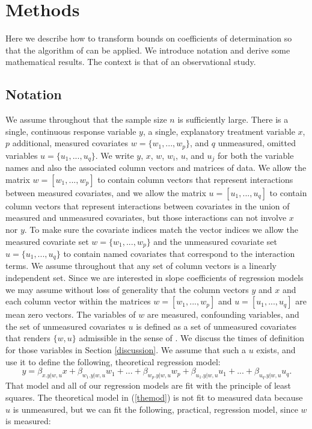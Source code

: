 \documentclass[11pt]{amsart}
\begin{document}
\section{Methods}
\label{methods}
Here we describe how to transform bounds on coefficients of determination so that the algorithm of \citep{KOA} can be applied. We introduce notation and derive some mathematical results. The context is that of an observational study. 
\subsection{Notation}We assume throughout that the sample size $n$ is sufficiently large. There is a single, continuous response variable $y$, a single, explanatory treatment variable $x$, $p$ additional, measured covariates $w=\{w_1,...,w_p\}$, and $q$ unmeasured, omitted variables $u=\{u_1,...,u_q\}$. We write $y$, $x$, $w$, $w_i$, $u$, and $u_j$ for both the variable names and also the associated column vectors and matrices of data. We allow the matrix $w=[w_1,...,w_p]$ to contain column vectors that represent interactions between measured covariates, and we allow the matrix $u=[u_1,...,u_q]$ to contain column vectors that represent interactions between covariates in the union of measured and unmeasured covariates, but those interactions can not involve $x$ nor $y$. To make sure the covariate indices match the vector indices we allow the measured covariate set $w=\{w_1,...,w_p\}$ and the unmeasured covariate set $u=\{u_1,...,u_q\}$ to contain named covariates that correspond to the interaction terms. We assume throughout that any set of column vectors is a linearly independent set. Since we are interested in slope coefficients of regression models we may assume without loss of generality that the column vectors $y$ and $x$ and each column vector within the matrices $w=[w_1,...,w_p]$ and $u=[u_1,...,u_q]$ are mean zero vectors. The variables of $w$ are measured, confounding variables, and the set of unmeasured covariates $u$ is defined as a set of unmeasured covariates that renders $\{w,u\}$ admissible in the sense of \citep{Pearl2009}. We discuss the times of definition for those variables in Section \ref{discussion}. We assume that such a $u$ exists, and use it to define the following, theoretical regression model:
\begin{equation}
\label{themod}
y=\beta_{x.y|w,u}x+\beta_{w_1.y|w,u}w_1+...+\beta_{w_p.y|w,u}w_p+\beta_{u_1.y|w,u}u_1+...+\beta_{u_q.y|w,u}u_q.
\end{equation}  
That model and all of our regression models are fit with the principle of least squares. The theoretical model in (\ref{themod}) is not fit to measured data because $u$ is unmeasured, but we can fit the following, practical, regression model, since $w$ is measured:
\end{document}

